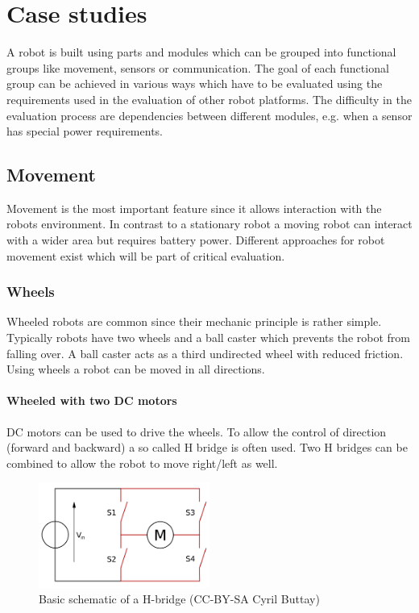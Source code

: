 \documentclass[twocolumn]{article}
\begin{document}
\section{Case studies}
A robot is built using parts and modules which can be grouped into functional groups like movement, sensors or communication. The goal of each functional group can be achieved in various ways which have to be evaluated using the requirements used in the evaluation of other robot platforms. The difficulty in the evaluation process are dependencies between different modules, e.g. when a sensor has special power requirements. 
\subsection{Movement}
Movement is the most important feature since it allows interaction with the robots environment. In contrast to a stationary robot a moving robot can interact with a wider area but requires battery power. Different approaches for robot movement exist which will be part of critical evaluation.
\subsubsection{Wheels}
Wheeled robots are common since their mechanic principle is rather simple. Typically robots have two wheels and a ball caster which prevents the robot from falling over. A ball caster acts as a third undirected wheel with reduced friction. Using wheels a robot can be moved in all directions.
\paragraph{Wheeled with two DC motors}
DC motors can be used to drive the wheels. To allow the control of direction (forward and backward) a so called H bridge is often used. Two H bridges can be combined to allow the robot to move right/left as well. 
\begin{figure}[h!]
  \centering
  \includegraphics[width=0.5\textwidth]{images/hbridge.png}
  \caption{Basic schematic of a H-bridge (CC-BY-SA Cyril Buttay)}
\end{figure}
\end{document}
